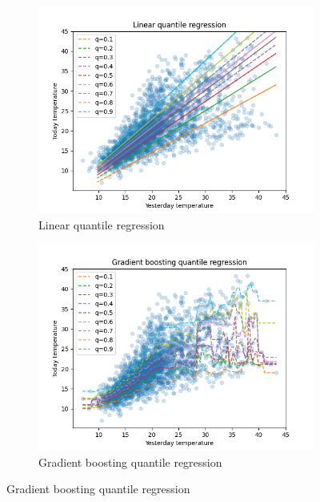 \begin{figure}[!htp]
    \begin{subfigure}[b]{0.5\linewidth}
      \centering
      \includegraphics[width=1.0\textwidth]{images/melbourne_linear_quantile_regression.png} 
      \caption{Linear quantile regression} 
      \label{fig:melbourne_linear_quantile_regression} 
      \vspace{4ex}
    \end{subfigure}%
    \begin{subfigure}[b]{0.5\linewidth}
      \centering
      \includegraphics[width=1.0\textwidth]{images/melbourne_gradient_boosting_quantile_regression.png} 
      \caption{Gradient boosting quantile regression} 
      \label{fig:melbourne_gradient_boosting_quantile_regression} 

\end{subfigure}
\end{figure}
